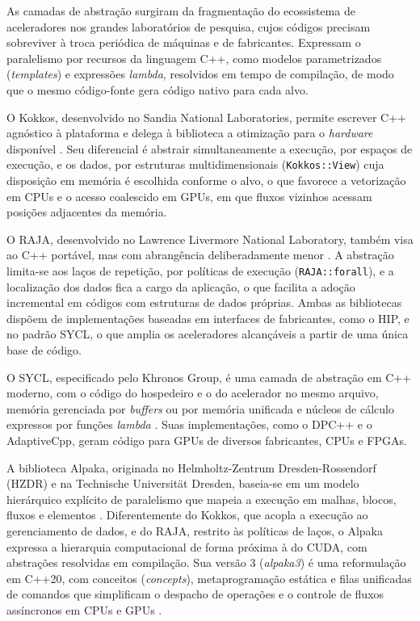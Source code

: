 As camadas de abstração surgiram da fragmentação do ecossistema de aceleradores nos grandes laboratórios de pesquisa, cujos códigos precisam sobreviver à troca periódica de máquinas e de fabricantes.
Expressam o paralelismo por recursos da linguagem C++, como modelos parametrizados (\textit{templates}) e expressões \textit{lambda}, resolvidos em tempo de compilação, de modo que o mesmo código-fonte gera código nativo para cada alvo.

O Kokkos, desenvolvido no Sandia National Laboratories, permite escrever C++ agnóstico à plataforma e delega à biblioteca a otimização para o \textit{hardware} disponível \parencite{CarterEdwards2014}.
Seu diferencial é abstrair simultaneamente a execução, por espaços de execução, e os dados, por estruturas multidimensionais (\texttt{Kokkos::View}) cuja disposição em memória é escolhida conforme o alvo, o que favorece a vetorização em CPUs e o acesso coalescido em GPUs, em que fluxos vizinhos acessam posições adjacentes da memória.

O RAJA, desenvolvido no Lawrence Livermore National Laboratory, também visa ao C++ portável, mas com abrangência deliberadamente menor \parencite{Beckingsale2019}.
A abstração limita-se aos laços de repetição, por políticas de execução (\texttt{RAJA::forall}), e a localização dos dados fica a cargo da aplicação, o que facilita a adoção incremental em códigos com estruturas de dados próprias.
Ambas as bibliotecas dispõem de implementações baseadas em interfaces de fabricantes, como o HIP, e no padrão SYCL, o que amplia os aceleradores alcançáveis a partir de uma única base de código.

O SYCL, especificado pelo Khronos Group, é uma camada de abstração em C++ moderno, com o código do hospedeiro e o do acelerador no mesmo arquivo, memória gerenciada por \textit{buffers} ou por memória unificada e núcleos de cálculo expressos por funções \textit{lambda} \parencite{Reinders2021, Khronos2020SYCL}.
Suas implementações, como o DPC++ e o AdaptiveCpp, geram código para GPUs de diversos fabricantes, CPUs e FPGAs.

A biblioteca Alpaka, originada no Helmholtz-Zentrum Dresden-Rossendorf (HZDR) e na Technische Universität Dresden, baseia-se em um modelo hierárquico explícito de paralelismo que mapeia a execução em malhas, blocos, fluxos e elementos \parencite{Zenker2016, Matthes2017}.
Diferentemente do Kokkos, que acopla a execução ao gerenciamento de dados, e do RAJA, restrito às políticas de laços, o Alpaka expressa a hierarquia computacional de forma próxima à do CUDA, com abstrações resolvidas em compilação.
Sua versão 3 (\textit{alpaka3}) é uma reformulação em C++20, com conceitos (\textit{concepts}), metaprogramação estática e filas unificadas de comandos que simplificam o despacho de operações e o controle de fluxos assíncronos em CPUs e GPUs \parencite{AlpakaContributors2026}.

